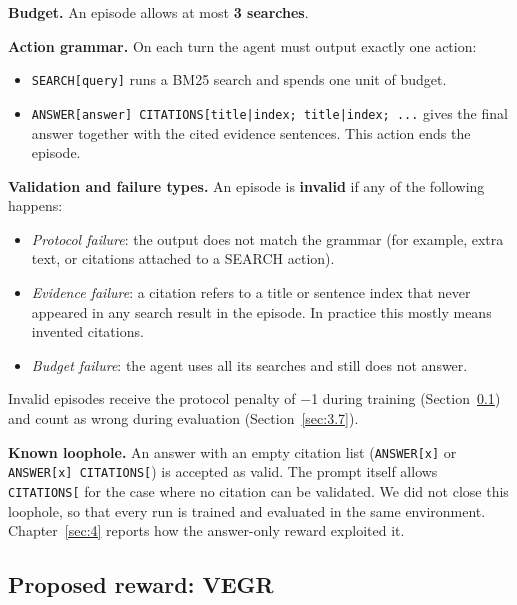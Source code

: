 \textbf{Budget.} An episode allows at most \textbf{3 searches}.

\textbf{Action grammar.} On each turn the agent must output exactly one
action:

\begin{itemize}
\tightlist
\item
  \texttt{SEARCH{[}\allowbreak{}query{]}} runs a BM25 search and spends
  one unit of budget.
\item
  \texttt{ANSWER{[}\allowbreak{}answer{]} CITATIONS{[}\allowbreak{}title|index; title|index; .\allowbreak{}.\allowbreak{}.\allowbreak{}{]}}
  gives the final answer together with the cited evidence sentences.
  This action ends the episode.
\end{itemize}

\textbf{Validation and failure types.} An episode is \textbf{invalid} if
any of the following happens:

\begin{itemize}
\tightlist
\item
  \emph{Protocol failure}: the output does not match the grammar (for
  example, extra text, or citations attached to a SEARCH action).
\item
  \emph{Evidence failure}: a citation refers to a title or sentence
  index that never appeared in any search result in the episode. In
  practice this mostly means invented citations.
\item
  \emph{Budget failure}: the agent uses all its searches and still does
  not answer.
\end{itemize}

Invalid episodes receive the protocol penalty of −1 during training
(Section~\ref{sec:3.4}) and count as wrong during evaluation
(Section~\ref{sec:3.7}).

\textbf{Known loophole.} An answer with an empty citation list
(\texttt{ANSWER{[}\allowbreak{}x{]}} or
\texttt{ANSWER{[}\allowbreak{}x{]} CITATIONS{[}\allowbreak{}{]}}) is
accepted as valid. The prompt itself allows
\texttt{CITATIONS{[}\allowbreak{}{]}} for the case where no citation can
be validated. We did not close this loophole, so that every run is
trained and evaluated in the same environment. Chapter~\ref{sec:4}
reports how the answer-only reward exploited it.

\subsection{Proposed reward: VEGR}\label{sec:3.4}

